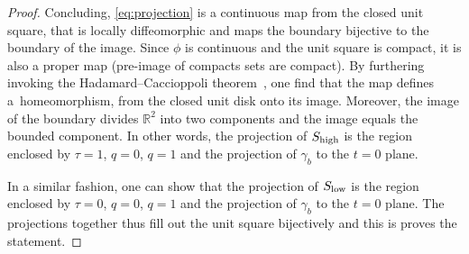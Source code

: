 \documentclass[pdftex]{sigma}
\numberwithin{equation}{section}
\begin{document}
\begin{proof}
 Concluding, \eqref{eq:projection} is a continuous map from the closed unit square, that is locally diffeomorphic and maps the boundary bijective to the boundary of the image. Since $\phi$ is continuous and the unit square is compact, it is also a proper map (pre-image of compacts sets are compact). By furthering invoking the Hadamard--Caccioppoli theorem~\cite{KrantzParks}, one find that the map defines a~homeomorphism, from the closed unit disk onto its image. Moreover, the image of the boundary divides $\mathbb R^2$ into two components and the image equals the bounded component. In other words, the projection of $S_{{\rm high}}$ is the region enclosed by $\tau=1$, $q=0$, $q=1$ and the projection of $\gamma_b$ to the $t=0$ plane.

 In a similar fashion, one can show that the projection of $S_{{\rm low}}$ is the region enclosed by $\tau=0$, $q=0$, $q=1$ and the projection of $\gamma_b$ to the $t=0$ plane. The projections together thus fill out the unit square bijectively and this is proves the statement.
 \end{proof}
\end{document}
